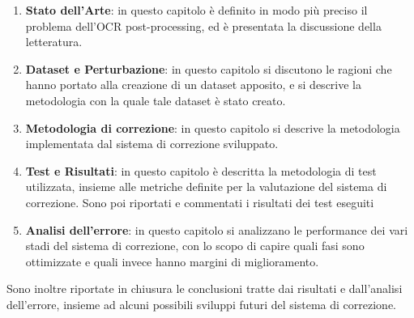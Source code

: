 \documentclass[12pt]{article}
\begin{document}
\begin{enumerate}
\item \textbf{Stato dell'Arte}: in questo capitolo è definito in modo più preciso il problema dell'OCR post-processing, ed è presentata la discussione della letteratura.

\item \textbf{Dataset e Perturbazione}: in questo capitolo si discutono le ragioni che hanno portato alla creazione di un dataset apposito, e si descrive la metodologia con la quale tale dataset è stato creato.

\item \textbf{Metodologia di correzione}: in questo capitolo si descrive la metodologia implementata dal sistema di correzione sviluppato.


\item \textbf{Test e Risultati}: in questo capitolo è descritta la metodologia di test utilizzata, insieme alle metriche definite per la valutazione del sistema di correzione. Sono poi riportati e commentati i risultati dei test eseguiti


\item \textbf{Analisi dell'errore}: in questo capitolo si analizzano le performance dei vari stadi del sistema di correzione, con lo scopo di capire quali fasi sono ottimizzate e quali invece hanno margini di miglioramento.
\end{enumerate}
\noindent
Sono inoltre riportate in chiusura le conclusioni tratte dai risultati e dall'analisi dell'errore, insieme ad alcuni possibili sviluppi futuri del sistema di correzione.


\nocite{bert}
\nocite{OCRMaskFilling}
\nocite{impatto_ocr_1}
\nocite{ocr_error_analysis}
\nocite{zhang2020spelling}





\end{document}

